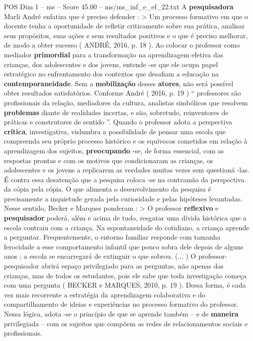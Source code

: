 \begin{textsample}{POS Dim 1 – ms – Score 45.00 – ms/ms\_inf\_e\_ef\_22.txt}
A \textbf{pesquisadora} Marli André enfatiza que é preciso defender : > Um processo formativo em que o docente tenha a oportunidade de refletir criticamente sobre sua prática, analisar seus propósitos, suas ações e seus resultados positivos e o que é preciso melhorar, de modo a obter sucesso ( ANDRÉ, 2016, p. 18 ).
Ao colocar o professor como mediador \textbf{primordial} para a transformação na aprendizagem efetiva das crianças, dos adolescentes e dos jovens, entende -se que ele ocupa papel estratégico no enfrentamento dos contextos que desafiam a educação na \textbf{contemporaneidade}.
Sem a \textbf{mobilização} desses \textbf{atores}, não será possível obter resultados satisfatórios.
Conforme André ( 2016, p. 19 ) “ professores são profissionais da relação, mediadores da cultura, analistas simbólicos que resolvem \textbf{problemas} diante de realidades incertas, e são, sobretudo, reinventores de práticas e construtores de sentido ”.
Quando o professor adota a perspectiva \textbf{crítica}, investigativa, vislumbra a possibilidade de pensar uma escola que compreenda seu próprio processo histórico e os equívocos cometidos em relação à aprendizagem dos sujeitos, \textbf{preocupando} -se, de forma essencial, com as respostas prontas e com os motivos que condicionaram as crianças, os adolescentes e os jovens a replicarem as verdades muitas vezes sem questioná -las.
É contra essa desatenção que a pesquisa coloca -se na contramão da perspectiva da cópia pela cópia.
O que alimenta o desenvolvimento da pesquisa é precisamente a inquietude gerada pela curiosidade e pelas hipóteses levantadas.
Nesse sentido, Becker e Marques ponderam : > O professor \textbf{reflexivo} e \textbf{pesquisador} poderá, além e acima de tudo, resgatar uma dívida histórica que a escola contraiu com a criança.
Na espontaneidade do cotidiano, a criança aprende a perguntar.
Frequentemente, o entorno familiar responde com tamanha ferocidade a esse comportamento infantil que pouco sobra dele depois de alguns anos ; a escola se encarregará de extinguir o que sobrou. (... ) O professor-pesquisador abrirá espaço privilegiado para as perguntas, não apenas das crianças, mas de todos os estudantes, pois ele sabe que toda investigação começa com uma pergunta ( BECKER e MARQUES, 2010, p. 19 ).
Dessa forma, é cada vez mais recorrente a estratégia da aprendizagem colaborativa e do compartilhamento de ideias e experiências no processo formativo do professor.
Nessa lógica, adota -se o princípio de que se aprende também – e de \textbf{maneira} privilegiada – com os sujeitos que compõem as redes de relacionamentos sociais e profissionais.

\end{textsample}
